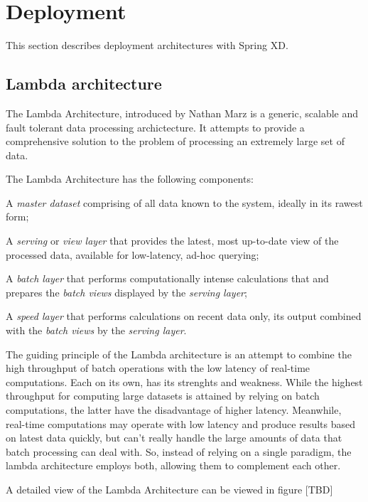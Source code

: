 \section{Deployment}
This section describes deployment architectures with Spring XD.
\subsection{Lambda architecture}

The Lambda Architecture, introduced by Nathan Marz \cite{lambda-architecture-paper} is a generic, scalable and fault tolerant data processing archictecture. It attempts to provide a comprehensive solution to the problem of processing an extremely large set of data.


The Lambda Architecture has the following components:

\begin{itemize*}
\item A \emph{master dataset} comprising of all data known to the system, ideally in its rawest form;
\item A \emph{serving} or \emph{view layer} that provides the latest, most up-to-date view of the processed data, available for low-latency, ad-hoc querying;
\item A \emph{batch layer} that performs computationally intense calculations that and prepares the \emph{batch views} displayed by the \emph{serving layer};
\item A \emph{speed layer} that performs calculations on recent data only, its output combined with the \emph{batch views} by the \emph{serving layer}.
\end{itemize*}

The guiding principle of the Lambda architecture is an attempt to combine the high throughput of batch operations with the low latency of real-time computations. Each on its own, has its strenghts and weakness. While the highest throughput for computing large datasets is attained by relying on batch computations, the latter have the disadvantage of higher latency. Meanwhile, real-time computations may operate with low latency and produce results based on latest data quickly, but can't really handle the large amounts of data that batch processing can deal with. So, instead of relying on a single paradigm, the lambda architecture employs both, allowing them to complement each other.

A detailed view of the Lambda Architecture can be viewed in figure [TBD]

